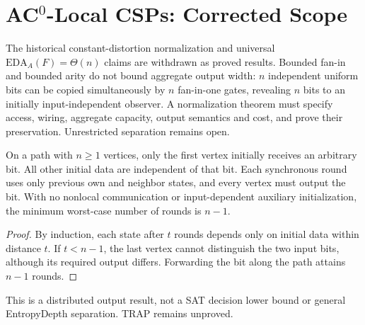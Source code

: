 \section{AC$^0$-Local CSPs: Corrected Scope}
The historical constant-distortion normalization and universal
$\mathrm{EDA}_A(F)=\Theta(n)$ claims are withdrawn as proved results.
Bounded fan-in and bounded arity do not bound aggregate output width:
$n$ independent uniform bits can be copied simultaneously by $n$
fan-in-one gates, revealing $n$ bits to an initially input-independent
observer. A normalization theorem must specify access, wiring,
aggregate capacity, output semantics and cost, and prove their
preservation. Unrestricted separation remains open.

\begin{theorem}\label{thm:ac0-path-broadcast}
On a path with $n\ge1$ vertices, only the first vertex initially
receives an arbitrary bit. All other initial data are independent of
that bit. Each synchronous round uses only previous own and neighbor
states, and every vertex must output the bit. With no nonlocal
communication or input-dependent auxiliary initialization, the minimum
worst-case number of rounds is $n-1$.
\end{theorem}
\begin{proof}
By induction, each state after $t$ rounds depends only on initial
data within distance $t$. If $t<n-1$, the last vertex cannot
distinguish the two input bits, although its required output differs.
Forwarding the bit along the path attains $n-1$ rounds.
\end{proof}
This is a distributed output result, not a SAT decision lower bound
or general EntropyDepth separation. TRAP remains unproved.
